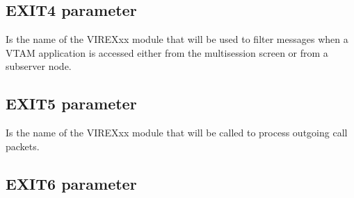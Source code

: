 \documentclass[letterpaper,10pt,english]{sphinxmanual}
\begin{document}
\subsection{EXIT4 parameter}
\label{\detokenize{Installation_Guide:exit4-parameter}}\label{\detokenize{Installation_Guide:index-58}}
\begin{sphinxVerbatim}[commandchars=\\\{\}]
 
\end{sphinxVerbatim}

\sphinxAtStartPar
{} \sphinxhyphen{} Is the name of the VIREXxx module that will be used to filter messages when a VTAM application is accessed either from the multi\sphinxhyphen{}session screen or from a sub\sphinxhyphen{}server node.

\ignorespaces 

\subsection{EXIT5 parameter}
\label{\detokenize{Installation_Guide:exit5-parameter}}\label{\detokenize{Installation_Guide:index-59}}
\begin{sphinxVerbatim}[commandchars=\\\{\}]
 
\end{sphinxVerbatim}

\sphinxAtStartPar
{} \sphinxhyphen{} Is the name of the VIREXxx module that will be called to process outgoing call packets.

\ignorespaces 

\subsection{EXIT6 parameter}
\label{\detokenize{Installation_Guide:exit6-parameter}}\label{\detokenize{Installation_Guide:index-60}}
\begin{sphinxVerbatim}[commandchars=\\\{\}]
 
\end{sphinxVerbatim}
\end{document}
